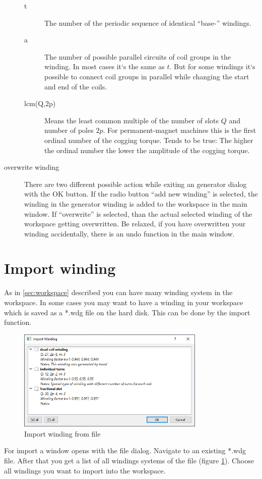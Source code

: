 \documentclass[]{scrreprt}
\begin{document}
\begin{description}
\begin{description}
    \item[t] The number of the periodic sequence of identical ``base-'' windings. 
    \item[a] The number of possible parallel circuits of coil groups in the winding. In most 
            cases it`s the same as $t$. But for some windings it`s possible to connect
            coil groups in parallel while changing the start and end of the coils.
    \item[lcm(Q,2p)] Means the least common multiple of the number of slots $Q$ and number
            of poles $2p$. For permanent-magnet machines this is the first ordinal
            number of the cogging torque. Tends to be true: The higher the ordinal number the lower the amplitude of the cogging torque.
    \end{description}
  \item[overwrite winding] There are two different possible action while exiting an generator dialog with
          the OK button. If the radio button "`add new winding"' is selected, the winding in the generator
          winding is added to the workspace in the main window. If "`overwrite"' is selected, than the 
          actual selected winding of the workspace getting overwritten. Be relaxed, if you have overwritten
          your winding accidentally, there is an undo function in the main window.
\end{description}
%
%
%
\section{Import winding}
As in \ref{sec:workspace} described you can have many winding system in the workspace.
In some cases you may want to have a winding in your workspace which is saved as a
*.wdg file on the hard disk. This can be done by the import function.
%
\begin{figure}[htpb]
    \centering
    \includegraphics[width=0.8\textwidth,angle=0]{fig/import}
    \caption{Import winding from file }
    \label{fig:import}
\end{figure}
%
For import a window opens with the file dialog. Navigate to an existing *.wdg file. After that you get a list of all windings systems of the file (figure \ref{fig:import}). Choose
all windings you want to import into the workspace.








\end{document}
